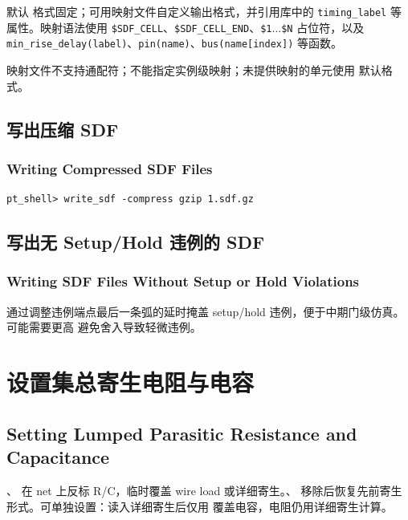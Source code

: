 默认  格式固定；可用映射文件自定义输出格式，并引用库中的 \texttt{timing\_label} 等属性。映射语法使用 \texttt{\$SDF\_CELL}、\texttt{\$SDF\_CELL\_END}、\texttt{\$1}...\texttt{\$N} 占位符，以及 \texttt{min\_rise\_delay(label)}、\texttt{pin(name)}、\texttt{bus(name[index])} 等函数。

\begin{noteBox}
映射文件不支持通配符；不能指定实例级映射；未提供映射的单元使用  默认格式。
\end{noteBox}

\subsection{写出压缩 SDF}
\subsubsection*{Writing Compressed SDF Files}

\begin{lstlisting}
pt_shell> write_sdf -compress gzip 1.sdf.gz
\end{lstlisting}

\subsection{写出无 Setup/Hold 违例的 SDF}
\subsubsection*{Writing SDF Files Without Setup or Hold Violations}

 通过调整违例端点最后一条弧的延时掩盖 setup/hold 违例，便于中期门级仿真。可能需要更高  避免舍入导致轻微违例。

\section{设置集总寄生电阻与电容}
\subsection*{Setting Lumped Parasitic Resistance and Capacitance}

、 在 net 上反标 R/C，临时覆盖 wire load 或详细寄生。、 移除后恢复先前寄生形式。可单独设置：读入详细寄生后仅用  覆盖电容，电阻仍用详细寄生计算。

